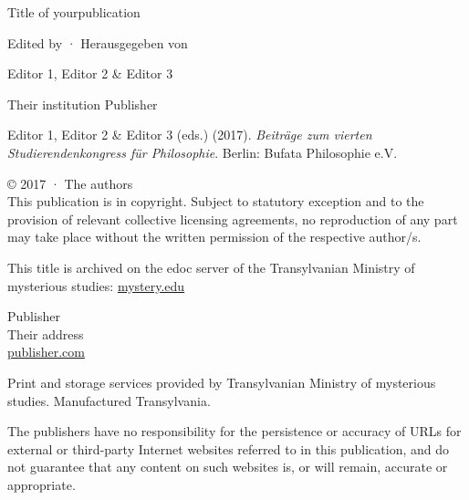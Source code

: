 \begin{titlingpage}
	\setlength{\droptitle}{2.427\baselineskip} %
	\vspace{\droptitle}
	\huge \hangindent=15pt Title of your\newline publication\par
	\vspace{\droptitle} 
	\large Edited by · Herausgegeben von\par\vspace{1.5\baselineskip} Editor 1, Editor 2 \& Editor 3\par\normalsize Their institution
	\vfill
	\large Publisher
	\newpage
	\begin{small}
		\raggedright
		
		Editor 1, Editor 2 \& Editor 3 (eds.) (2017). \textit{Beiträge zum vierten Studierendenkongress für Philosophie}. Berlin: Bufata Philosophie e.V.
		
		\bigskip
		© 2017 · The authors\\
		This publication is in copyright. Subject to statutory exception and to the provision of relevant collective licensing agreements, no reproduction of any part may take place without the written permission of the respective author/s.
		
		\bigskip
		
		This title is archived on the edoc server of the Transylvanian Ministry of mysterious studies: \href{https://mystery.edu}{mystery.edu}
		
		\bigskip
		
		Publisher\\
		Their address\\
		\href{http://publisher.com}{publisher.com}\\
		\bigskip
		
		Print and storage services provided by Transylvanian Ministry of mysterious studies. Manufactured Transylvania.
		
		\bigskip\raggedright
		The publishers have no responsibility for the persistence or accuracy of URLs for external or third-party Internet websites referred to in this publication, and do not guarantee that any content on such websites is, or will remain, accurate or appropriate.
		\vfill
\end{small}\end{titlingpage}